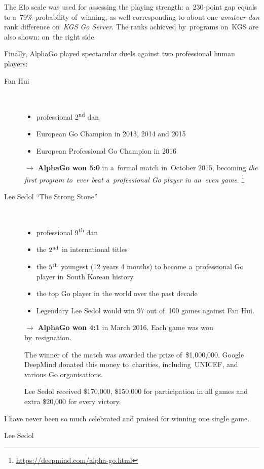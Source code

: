 The Elo scale was used for assessing the playing strength:
a~230-point gap equals to a~79\%-probability of~winning, as well corresponding to about one \emph{amateur dan} rank difference on~\emph{KGS Go Server}\footnotemark.
The ranks achieved by~programs on~KGS are also shown: on~the right side.

Finally, AlphaGo played spectacular duels against two professional human players:
\begin{description}
  \item [Fan Hui]~
    \begin{itemize}
      \item professional 2\textsuperscript{nd} dan
      \item European Go Champion in 2013, 2014 and 2015
      \item European Professional Go Champion in 2016 
    \end{itemize}
    $\rightarrow$ \textbf{AlphaGo won 5:0} in a~formal match in~October 2015, becoming \emph{the first program to~ever beat a~professional Go player in an~even game}.%
    \footnote{\href{https://deepmind.com/alpha-go.html}{https://deepmind.com/alpha-go.html}}

  \item [Lee Sedol ``The Strong Stone'']~
    \begin{itemize}
      \item professional 9\textsuperscript{th} dan 
      \item the $2\textsuperscript{nd}$ in international titles
      \item the $5\textsuperscript{th}$ youngest (12 years 4 months) to become a~professional Go player in~South Korean history
      \item the top Go player in the world over the past decade
      \item Legendary Lee Sedol would win 97 out of~100 games against Fan Hui.
    \end{itemize}
    $\rightarrow$ \textbf{AlphaGo won 4:1} in March 2016.
    Each game was won by~resignation.

    The winner of~the match was awarded the prize of~\$1,000,000.
    Google DeepMind donated this money to~charities, including~UNICEF, and various Go organisations.

    Lee Sedol received \$170,000, \$150,000 for participation in all games and extra \$20,000 for every victory.
\end{description}

\epigraph{
  I have never been so much celebrated and praised for winning one single game.
}{Lee Sedol}

